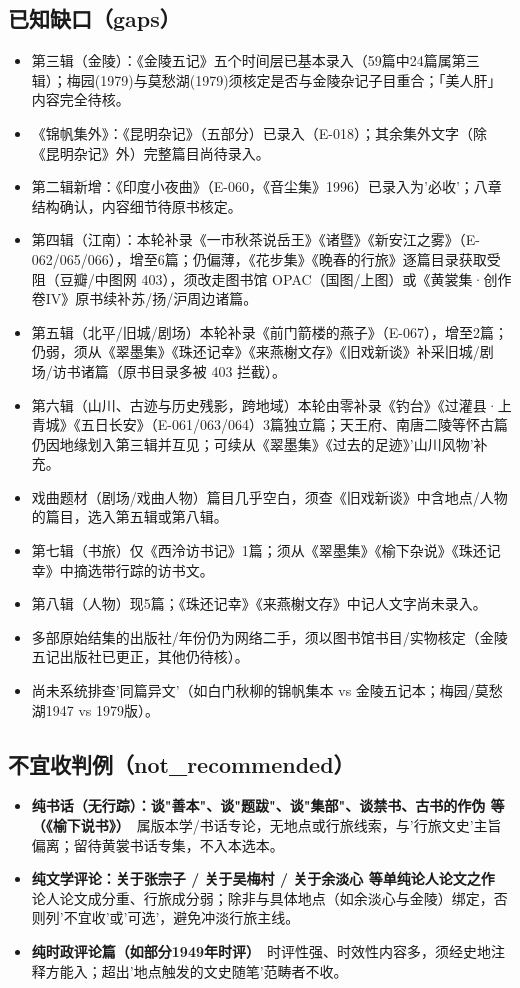 \documentclass[UTF8,fontset=none,zihao=-4,a4paper]{ctexart}
\begin{document}
\subsection{已知缺口（gaps）}
\begin{itemize}
\item 第三辑（金陵）：《金陵五记》五个时间层已基本录入（59篇中24篇属第三辑）；梅园(1979)与莫愁湖(1979)须核定是否与金陵杂记子目重合；「美人肝」内容完全待核。
\item 《锦帆集外》：《昆明杂记》（五部分）已录入（E-018）；其余集外文字（除《昆明杂记》外）完整篇目尚待录入。
\item 第二辑新增：《印度小夜曲》（E-060，《音尘集》1996）已录入为'必收'；八章结构确认，内容细节待原书核定。
\item 第四辑（江南）：本轮补录《一市秋茶说岳王》《诸暨》《新安江之雾》（E-062/065/066），增至6篇；仍偏薄，《花步集》《晚春的行旅》逐篇目录获取受阻（豆瓣/中图网 403），须改走图书馆 OPAC（国图/上图）或《黄裳集·创作卷IV》原书续补苏/扬/沪周边诸篇。
\item 第五辑（北平/旧城/剧场）本轮补录《前门箭楼的燕子》（E-067），增至2篇；仍弱，须从《翠墨集》《珠还记幸》《来燕榭文存》《旧戏新谈》补采旧城/剧场/访书诸篇（原书目录多被 403 拦截）。
\item 第六辑（山川、古迹与历史残影，跨地域）本轮由零补录《钓台》《过灌县·上青城》《五日长安》（E-061/063/064）3篇独立篇；天王府、南唐二陵等怀古篇仍因地缘划入第三辑并互见；可续从《翠墨集》《过去的足迹》'山川风物'补充。
\item 戏曲题材（剧场/戏曲人物）篇目几乎空白，须查《旧戏新谈》中含地点/人物的篇目，选入第五辑或第八辑。
\item 第七辑（书旅）仅《西泠访书记》1篇；须从《翠墨集》《榆下杂说》《珠还记幸》中摘选带行踪的访书文。
\item 第八辑（人物）现5篇；《珠还记幸》《来燕榭文存》中记人文字尚未录入。
\item 多部原始结集的出版社/年份仍为网络二手，须以图书馆书目/实物核定（金陵五记出版社已更正，其他仍待核）。
\item 尚未系统排查'同篇异文'（如白门秋柳的锦帆集本 vs 金陵五记本；梅园/莫愁湖1947 vs 1979版）。
\end{itemize}
\subsection{不宜收判例（not\_recommended）}
\begin{itemize}
\item \textbf{纯书话（无行踪）：谈"善本"、谈"题跋"、谈"集部"、谈禁书、古书的作伪 等（《榆下说书》）}　属版本学/书话专论，无地点或行旅线索，与'行旅文史'主旨偏离；留待黄裳书话专集，不入本选本。
\item \textbf{纯文学评论：关于张宗子 / 关于吴梅村 / 关于余淡心 等单纯论人论文之作}　论人论文成分重、行旅成分弱；除非与具体地点（如余淡心与金陵）绑定，否则列'不宜收'或'可选'，避免冲淡行旅主线。
\item \textbf{纯时政评论篇（如部分1949年时评）}　时评性强、时效性内容多，须经史地注释方能入；超出'地点触发的文史随笔'范畴者不收。
\end{itemize}
\end{document}
